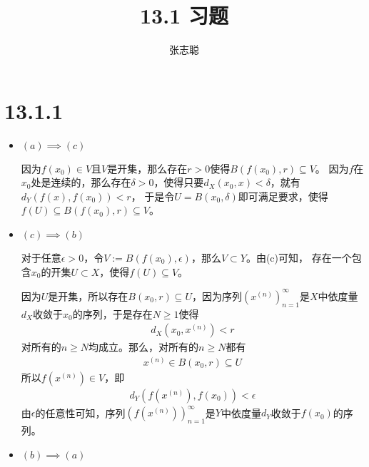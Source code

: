 \documentclass{article}
\begin{document}
\title{13.1 习题}
\author{张志聪}
\maketitle

\section*{13.1.1}

\begin{itemize}
  \item $(a) \implies (c)$

        因为$f(x_0) \in V$且$V$是开集，那么存在$r > 0$使得$B(f(x_0), r) \subseteq V$。
        因为$f$在$x_0$处是连续的，那么存在$\delta > 0$，使得只要$d_X(x_0, x) < \delta$，就有
        $d_Y(f(x), f(x_0)) < r$，
        于是令$U = B(x_0, \delta)$即可满足要求，使得$f(U) \subseteq B(f(x_0), r) \subseteq V$。

  \item $(c) \implies (b)$

        对于任意$\epsilon > 0$，令$V := B(f(x_0), \epsilon)$，那么$V \subset Y$。由(c)可知，
        存在一个包含$x_0$的开集$U \subset X$，使得$f(U) \subseteq V$。

        因为$U$是开集，所以存在$B(x_0, r) \subseteq U$，因为序列$(x^{(n)})_{n = 1}^\infty$是$X$中依度量
        $d_X$收敛于$x_0$的序列，于是存在$N \geq 1$使得
        \begin{align*}
          d_X(x_0, x^{(n)}) < r
        \end{align*}
        对所有的$n \geq N$均成立。那么，对所有的$n \geq N$都有
        \begin{align*}
          x^{(n)} \in B(x_0, r) \subseteq U
        \end{align*}
        所以$f(x^{(n)}) \in V$，即
        \begin{align*}
          d_Y(f(x^{(n)}), f(x_0)) < \epsilon
        \end{align*}
        由$\epsilon$的任意性可知，序列$(f(x^{(n)}))_{n = 1}^\infty$是$Y$中依度量$d_Y$收敛于$f(x_0)$的序列。

  \item $(b) \implies (a)$

        
\end{itemize}
\end{document}
